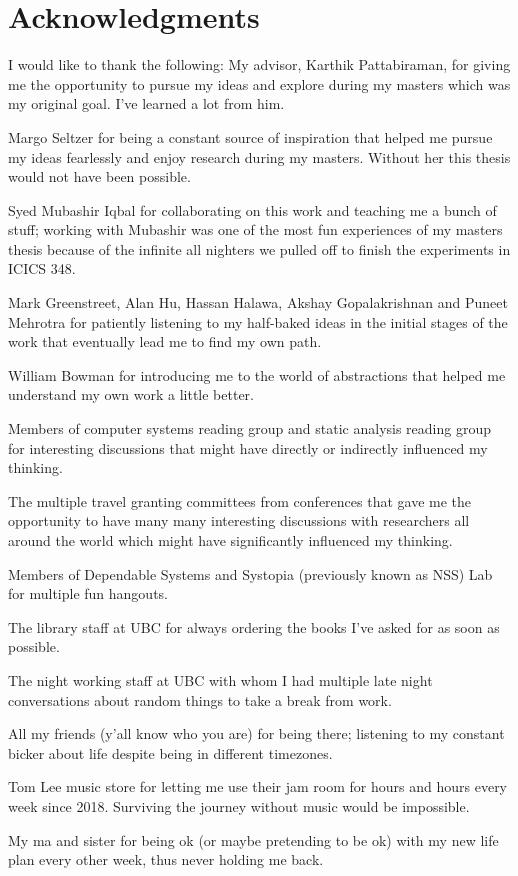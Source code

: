 
\chapter{Acknowledgments}

I would like to thank the following:
My advisor, Karthik Pattabiraman, for giving me the opportunity to pursue my ideas and explore during my masters which was my original goal. I've learned a lot from him. 

Margo Seltzer for being a constant source of inspiration that helped me pursue my ideas fearlessly and enjoy research during my masters. Without her this thesis would not have been possible. 

Syed Mubashir Iqbal for collaborating on this work and teaching me a bunch of stuff; working with Mubashir was one of the most fun experiences of my masters thesis because of the infinite all nighters we pulled off to finish the experiments in ICICS 348. 

Mark Greenstreet, Alan Hu, Hassan Halawa, Akshay Gopalakrishnan and Puneet Mehrotra for patiently listening to my half-baked ideas in the initial stages of the work that eventually lead me to find my own path. 

William Bowman for introducing me to the world of abstractions that helped me understand my own work a little better.  

Members of computer systems reading group and static analysis reading group for interesting discussions that might have directly or indirectly influenced my thinking. 

The multiple travel granting committees from conferences that gave me the opportunity to have many many interesting discussions with researchers all around the world which might have significantly influenced my thinking. 

Members of Dependable Systems and Systopia (previously known as NSS) Lab for multiple fun hangouts. 

The library staff at UBC for always ordering the books I've asked for as soon as possible.

The night working staff at UBC with whom I had multiple late night conversations about random things to take a break from work. 


All my friends (y'all know who you are) for being there; listening to my constant bicker about life despite being in different timezones.   

Tom Lee music store for letting me use their jam room for hours and hours every week since 2018. Surviving the journey without music would be impossible. 

My ma and sister for being ok (or maybe pretending to be ok) with my new life plan every other week, thus never holding me back. 




